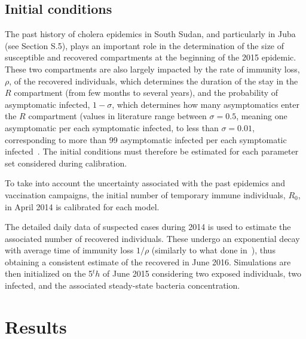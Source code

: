 \subsection{Initial conditions}
 The past history of cholera epidemics in South Sudan, and particularly in Juba (see Section S.5), plays an important role in the determination of the size of susceptible and recovered compartments at the beginning of the 2015 epidemic. These two compartments are also largely impacted by the rate of immunity loss, $\rho$, of the recovered individuals, which determines the duration of the stay in the $R$ compartment (from few months to several years), and the probability of asymptomatic infected, $1-\sigma$, which determines how many asymptomatics enter the $R$ compartment (values in literature range between $\sigma=0.5$, meaning one asymptomatic per each symptomatic infected, to less than $\sigma=0.01$, corresponding to more than 99 asymptomatic infected per each symptomatic infected~\cite{fung14}. The initial conditions must therefore be estimated for each parameter set considered during calibration.
 
 To take into account the uncertainty associated with the past epidemics and vaccination campaigns, the initial number of temporary immune individuals, $R_0$, in April 2014 is calibrated for each model.
 
 The detailed daily data of suspected cases during 2014 is used to estimate the associated number of recovered individuals. These undergo an exponential decay with average time of immunity loss $1/\rho$ (similarly to what done in~\cite{pasettoRealtimeProjectionsCholera2017}), thus obtaining a consistent estimate of the recovered in June 2016. Simulations are then initialized on the 5$^th$ of June 2015 considering two exposed individuals, two infected, and the associated steady-state bacteria concentration. 
 
\section{Results}
\label{sec:res}

